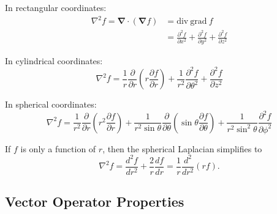 In rectangular coordinates:
\begin{align*}
    \nabla^2 f = \bm{\nabla}\cdot(\bm{\nabla}f) & = \text{div}~\text{grad}~f                                                                                  \\
                                                & = \frac{\partial^2 f}{\partial x^2} + \frac{\partial^2 f}{\partial y^2} + \frac{\partial^2 f}{\partial z^2}
\end{align*}

In cylindrical coordinates:
\begin{equation*}
    \nabla^2 f = \frac{1}{r}\frac{\partial}{\partial r}\left(r\frac{\partial f}{\partial r}\right) + \frac{1}{r^2}\frac{\partial^2 f}{\partial \theta^2} + \frac{\partial^2 f}{\partial z^2}
\end{equation*}

In spherical coordinates:
\begin{equation*}
    \nabla^2 f = \frac{1}{r^2}\frac{\partial}{\partial r}\left(r^2\frac{\partial f}{\partial r}\right) + \frac{1}{r^2\sin\theta}\frac{\partial}{\partial \theta}\left(\sin\theta\frac{\partial f}{\partial \theta}\right) + \frac{1}{r^2\sin^2\theta}\frac{\partial^2 f}{\partial \phi^2}
\end{equation*}

If $f$ is only a function of $r$, then the spherical Laplacian simplifies to
\begin{equation*}
    \nabla^2 f = \frac{d^2f}{dr^2} + \frac{2}{r}\frac{df}{dr} = \frac{1}{r} \frac{d^2}{dr^2} (rf) \text{.}
\end{equation*}

\subsection{Vector Operator Properties}

